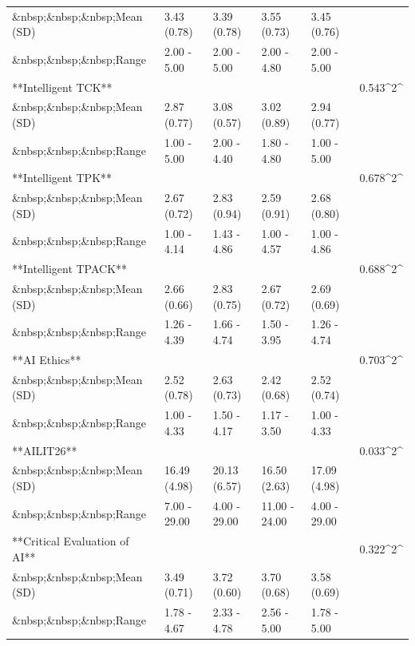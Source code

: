 \documentclass[
  letterpaper,
  DIV=11,
  numbers=noendperiod]{scrartcl}
\begin{document}
\begin{table}
{\begin{tabular}{llllll}
\&nbsp;\&nbsp;\&nbsp;Mean (SD) & 3.43 (0.78) & 3.39 (0.78) & 3.55 (0.73) & 3.45 (0.76) & \\
\addlinespace
\&nbsp;\&nbsp;\&nbsp;Range & 2.00 - 5.00 & 2.00 - 5.00 & 2.00 - 4.80 & 2.00 - 5.00 & \\
**Intelligent TCK** &  &  &  &  & 0.543\textasciicircum{}2\textasciicircum{}\\
\&nbsp;\&nbsp;\&nbsp;Mean (SD) & 2.87 (0.77) & 3.08 (0.57) & 3.02 (0.89) & 2.94 (0.77) & \\
\&nbsp;\&nbsp;\&nbsp;Range & 1.00 - 5.00 & 2.00 - 4.40 & 1.80 - 4.80 & 1.00 - 5.00 & \\
**Intelligent TPK** &  &  &  &  & 0.678\textasciicircum{}2\textasciicircum{}\\
\addlinespace
\&nbsp;\&nbsp;\&nbsp;Mean (SD) & 2.67 (0.72) & 2.83 (0.94) & 2.59 (0.91) & 2.68 (0.80) & \\
\&nbsp;\&nbsp;\&nbsp;Range & 1.00 - 4.14 & 1.43 - 4.86 & 1.00 - 4.57 & 1.00 - 4.86 & \\
**Intelligent TPACK** &  &  &  &  & 0.688\textasciicircum{}2\textasciicircum{}\\
\&nbsp;\&nbsp;\&nbsp;Mean (SD) & 2.66 (0.66) & 2.83 (0.75) & 2.67 (0.72) & 2.69 (0.69) & \\
\&nbsp;\&nbsp;\&nbsp;Range & 1.26 - 4.39 & 1.66 - 4.74 & 1.50 - 3.95 & 1.26 - 4.74 & \\
\addlinespace
**AI Ethics** &  &  &  &  & 0.703\textasciicircum{}2\textasciicircum{}\\
\&nbsp;\&nbsp;\&nbsp;Mean (SD) & 2.52 (0.78) & 2.63 (0.73) & 2.42 (0.68) & 2.52 (0.74) & \\
\&nbsp;\&nbsp;\&nbsp;Range & 1.00 - 4.33 & 1.50 - 4.17 & 1.17 - 3.50 & 1.00 - 4.33 & \\
**AILIT26** &  &  &  &  & 0.033\textasciicircum{}2\textasciicircum{}\\
\&nbsp;\&nbsp;\&nbsp;Mean (SD) & 16.49 (4.98) & 20.13 (6.57) & 16.50 (2.63) & 17.09 (4.98) & \\
\addlinespace
\&nbsp;\&nbsp;\&nbsp;Range & 7.00 - 29.00 & 4.00 - 29.00 & 11.00 - 24.00 & 4.00 - 29.00 & \\
**Critical Evaluation of AI** &  &  &  &  & 0.322\textasciicircum{}2\textasciicircum{}\\
\&nbsp;\&nbsp;\&nbsp;Mean (SD) & 3.49 (0.71) & 3.72 (0.60) & 3.70 (0.68) & 3.58 (0.69) & \\
\&nbsp;\&nbsp;\&nbsp;Range & 1.78 - 4.67 & 2.33 - 4.78 & 2.56 - 5.00 & 1.78 - 5.00 & \\
\bottomrule
\end{tabular}

}

\end{table}%
\end{document}
